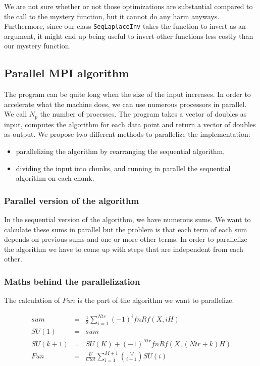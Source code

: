 \documentclass[11pt,a4paper]{article}
\begin{document}
We are not sure whether or not those optimizations are substantial compared to the call to the mystery function, but it cannot do any harm anyways. Furthermore, since our class \verb_SeqLaplaceInv_ takes the function to invert as an argument, it might end up being useful to invert other functions less costly than our mystery function.

\subsection{Parallel MPI algorithm}

The program can be quite long when the size of the input increases. In order to accelerate what the machine does, we can use numerous processors in parallel. We call $N_p$ the number of processes. The program takes a vector of doubles as input, computes the algorithm for each data point and return a vector of doubles as output. We propose two different methods to parallelize the implementation:

\begin{itemize}

\item parallelizing the algorithm by rearranging the sequential algorithm,

\item dividing the input into chunks, and running in parallel the sequential algorithm on each chunk.

\end{itemize}

\subsubsection{Parallel version of the algorithm}

In the sequential version of the algorithm, we have numerous sums. We want to calculate these sums in parallel but the problem is that each term of each sum depends on previous sums and one or more other terms. In order to parallelize the algorithm we have to come up with steps that are independent from each other.

\subsubsection*{Maths behind the parallelization}

The calculation of $Fun$ is the part of the algorithm we want to parallelize.

\begin{eqnarray}
	sum &=& \frac{1}{2}   \sum_{i=1}^{Ntr} (-1)^{i}fnRf(X,iH)\\
	SU(1) &=& sum  \\
	SU(k + 1) &=& SU(K) + (-1)^{Ntr}fnRf(X,(Ntr + k)H) \label{SU(i)}\\
	Fun &=&\frac{U}{Ctot} \sum_{i=1}^{M+1} \binom{M}{i-1}SU(i) \label{Fun}
\end{eqnarray}
\end{document}
